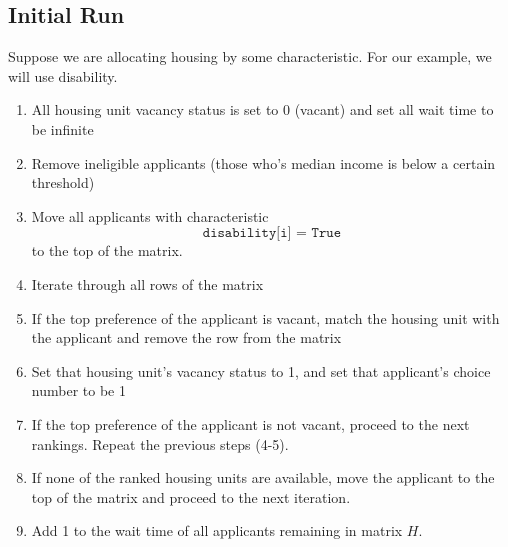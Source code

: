 \documentclass[11pt]{article}
\begin{document}
\subsection{Initial Run}
Suppose we are allocating housing by some characteristic. For our example, we will use disability.\\
\begin{enumerate}
    \item All housing unit vacancy status is set to 0 (vacant) and set all wait time to be infinite
    \item Remove ineligible applicants (those who's median income is below a certain threshold)
    \item Move all applicants with characteristic \[\texttt{disability[i] = True}\]
    to the top of the matrix.
    \item Iterate through all rows of the matrix
    \item If the top preference of the applicant is vacant, match the housing unit with the applicant and remove the row from the matrix
    \item Set that housing unit's vacancy status to 1, and set that applicant's choice number to be 1
    \item If the top preference of the applicant is not vacant, proceed to the next rankings. Repeat the previous steps (4-5).
    \item If none of the ranked housing units are available, move the applicant to the top of the matrix and proceed to the next iteration.
    \item Add 1 to the wait time of all applicants remaining in matrix $H$.
\end{enumerate}
\end{document}
